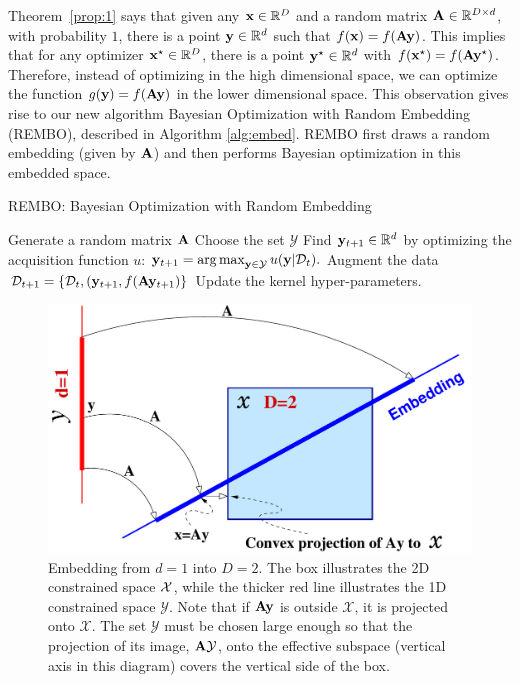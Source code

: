 \documentclass{article}
\DeclareMathOperator*{\argmax}{arg\,max}
\begin{document}
Theorem~\ref{prop:1} says that given any $\mathbf{x} \in \mathbb{R}^D$ and a random matrix $\mathbf{A} \in \mathbb{R}^{D\times d}$, with probability $1$, there is a point $\mathbf{y} \in \mathbb{R}^d$ such that $f(\mathbf{x}) = f(\mathbf{A}\mathbf{y})$. 
This implies that for any optimizer $\mathbf{x}^{\star} \in \mathbb{R}^D$, there is a point $\mathbf{y}^{\star} \in \mathbb{R}^d$ with $f(\mathbf{x}^\star) = f(\mathbf{A}\mathbf{y}^{\star})$. Therefore, instead of optimizing in the high dimensional space, we can optimize the function $g(\mathbf{y}) = f(\mathbf{A}\mathbf{y})$ in the lower dimensional space.
This observation gives rise to our new algorithm Bayesian Optimization with Random Embedding (REMBO), described in Algorithm \ref{alg:embed}. REMBO first draws a random embedding (given by $\mathbf{A}$) and then performs Bayesian optimization in this embedded space.

\begin{algorithm}[h!]
\caption{REMBO: Bayesian Optimization with Random Embedding}
\label{alg:embed}
\begin{algorithmic}[1]
{
\STATE Generate a random matrix $\mathbf{A}$
\STATE Choose the set $\mathcal{Y}$
  \STATE Find $\mathbf{y}_{t+1} \in \mathbb{R}^d$ by optimizing the acquisition function $u$: $\vy_{t+1} = \argmax_{\vy\in \mathcal{Y}} u(\vy|\mathcal{D}_t).$ 
  \STATE Augment the data $\mathcal{D}_{t+1} = \{\mathcal{D}_{t}, (\mathbf{y}_{t+1}, f(\mathbf{A}\mathbf{y}_{t+1}) \}$
\STATE Update the kernel hyper-parameters.
\ENDFOR
}
\end{algorithmic}
\end{algorithm}


\begin{figure}[t!]
\centering
  \includegraphics[scale=0.28]{figures/projection.pdf}
  \caption{Embedding from $d=1$ into $D=2$. The box illustrates the 2D constrained space ${\cal X}$, while the thicker red line illustrates the 1D constrained space $\mathcal{Y}$. Note that if $\mathbf{A}\mathbf{y}$ is outside $\mathcal{X}$, it is projected onto $\mathcal{X}$. The set $\mathcal{Y}$ must be chosen large enough so that the projection of its image, $\mathbf{A} \mathcal{Y}$, onto the effective subspace (vertical axis in this diagram) covers the vertical side of the box.}
  \label{fig:proj}
\end{figure}
\end{document}
